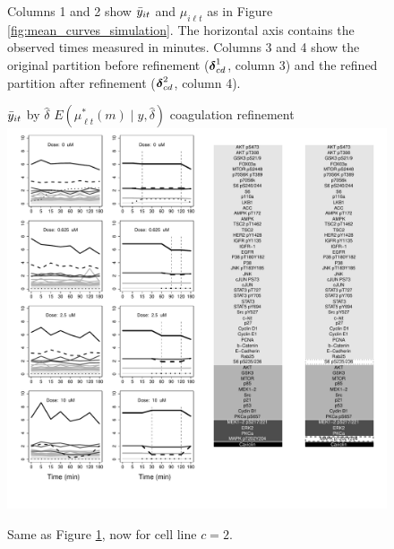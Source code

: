 \begin{figure}[tbp]
{  Columns 1 and 2 show $\bar{y}_{it}$ and $\mu_{i\ell t}$ as in
  Figure \ref{fig:mean_curves_simulation}. The horizontal axis contains the observed times
  measured in minutes.
  Columns 3 and 4 show the original partition before refinement
  ($\mbox{\boldmath $\delta$}^1_{cd}$, column 3) and
  the refined partition after refinement ($\mbox{\boldmath $\delta$}^2_{cd}$, column 4).}
\label{fig:result_c1_d1}
\end{figure}


\begin{figure}[tbp]
\phantom{xx} 
\hskip 2cm $\bar{y}_{it}$ by $\hat{\delta}$  \hspace{0.8cm} $E(\mu^*_{\ell t}(m)\mid y, \hat{\delta})$
  \hspace{0.9cm} coagulation \hspace{0.9cm} refinement\\
\includegraphics[scale=0.4]{figs_biometrics/results_cc_2_d_1_gray.pdf}\\[-.5cm]
\caption{
Same as Figure \ref{fig:result_c1_d1}, now for cell line $c=2$.}
\label{fig:result_c2_d1}
\end{figure}



